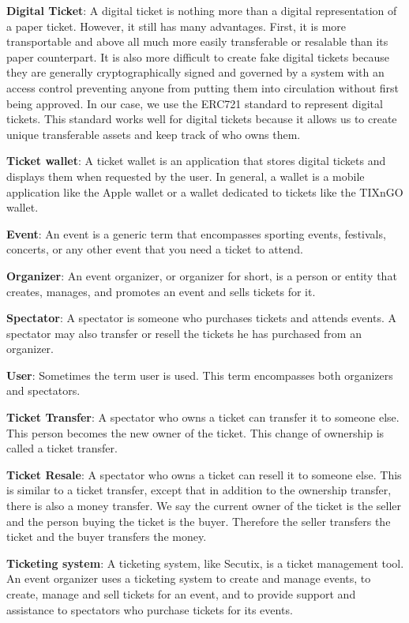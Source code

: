 \documentclass[a4paper,11pt,oneside]{report}
\begin{document}
\begin{description} 
    \item \textbf{Digital Ticket}: A digital ticket is nothing more than a digital representation of a paper ticket. However, it still has many advantages. First, it is more transportable and above all much more easily transferable or resalable than its paper counterpart. It is also more difficult to create fake digital tickets because they are generally cryptographically signed and governed by a system with an access control preventing anyone from putting them into circulation without first being approved. In our case, we use the ERC721 standard to represent digital tickets. This standard works well for digital tickets because it allows us to create unique transferable assets and keep track of who owns them.
    \item \textbf{Ticket wallet}: A ticket wallet is an application that stores digital tickets and displays them when requested by the user. In general, a wallet is a mobile application like the Apple wallet or a wallet dedicated to tickets like the TIXnGO wallet.
    \item \textbf{Event}: An event is a generic term that encompasses sporting events, festivals, concerts, or any other event that you need a ticket to attend.
    \item \textbf{Organizer}: An event organizer, or organizer for short, is a person or entity that creates, manages, and promotes an event and sells tickets for it.
    \item \textbf{Spectator}: A spectator is someone who purchases tickets and attends events. A spectator may also transfer or resell the tickets he has purchased from an organizer.
    \item \textbf{User}: Sometimes the term user is used. This term encompasses both organizers and spectators.
    \item \textbf{Ticket Transfer}: A spectator who owns a ticket can transfer it to someone else. This person becomes the new owner of the ticket. This change of ownership is called a ticket transfer.
    \item \textbf{Ticket Resale}: A spectator who owns a ticket can resell it to someone else. This is similar to a ticket transfer, except that in addition to the ownership transfer, there is also a money transfer. We say the current owner of the ticket is the seller and the person buying the ticket is the buyer. Therefore the seller transfers the ticket and the buyer transfers the money.
    \item \textbf{Ticketing system}: A ticketing system, like Secutix, is a ticket management tool. An event organizer uses a ticketing system to create and manage events, to create, manage and sell tickets for an event, and to provide support and assistance to spectators who purchase tickets for its events.

\end{description}
\end{document}
